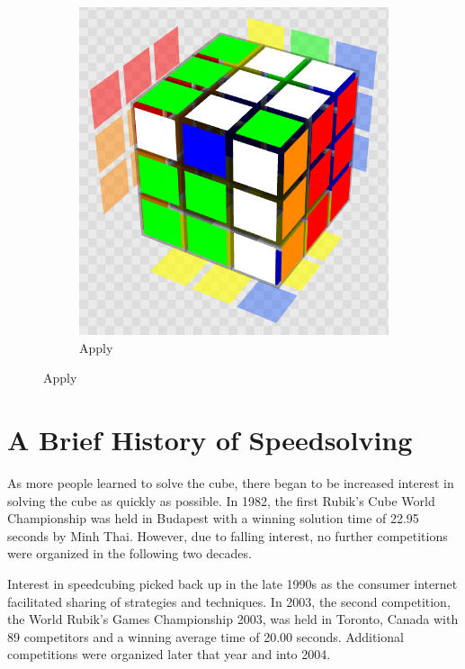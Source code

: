 \begin{figure}[h]
\begin{subfigure}{0.25\textwidth}
    \end{subfigure}%
    \begin{subfigure}{0.25\textwidth}
        \centering
        \caption{Apply }
        \label{fig:notation-demo-rprime}
        \includegraphics[width=.90\linewidth]{Figures/2 Background/R'.png}
    \end{subfigure}%
\end{figure}


\section{A Brief History of Speedsolving}
\label{sec:speedsolving}

As more people learned to solve the cube, there began to be increased
interest in solving the cube as quickly as possible. In 1982, the first
Rubik's Cube World Championship was held in Budapest with a winning
solution time of 22.95 seconds by Minh Thai. However, due to falling
interest, no further competitions were organized in the following two
decades.

Interest in speedcubing picked back up in the late 1990s as the
consumer internet facilitated sharing of strategies and techniques. In
2003, the second competition, the World Rubik's Games Championship
2003, was held in Toronto, Canada with 89 competitors and a winning
average time of 20.00 seconds. Additional competitions were organized
later that year and into 2004. \cite{wca-speedcubing-history}

